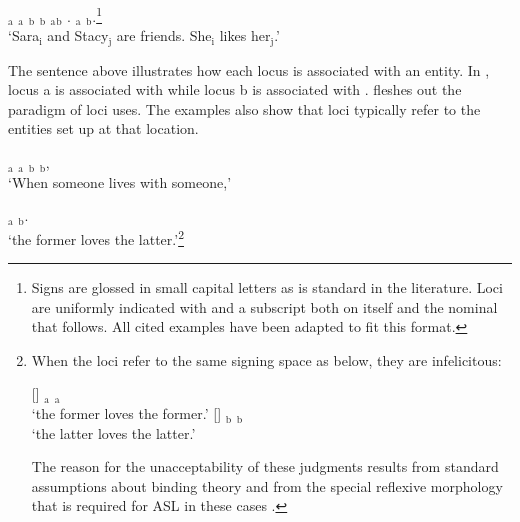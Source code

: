\documentclass[output=paper,
modfonts
]{langscibook}
\begin{document}
\begin{exe}
\ex \label{ex:irani:1} 
$_\text{a}$ $_\text{a}$ $_\text{b}$ $_\text{b}$ $_\text{a}$$_\text{b}$ . $_\text{a}$  $_\text{b}$.\footnote{Signs are glossed in small capital letters as is standard in the literature. Loci are uniformly indicated with  and a subscript both on  itself and the nominal that follows. All cited examples have been adapted to fit this format.}\\
`Sara$_\text{i}$ and Stacy$_\text{j}$ are friends. She$_\text{i}$ likes her$_\text{j}$.'
\end{exe}

The sentence above illustrates how each locus is associated with an entity. In , locus a is associated with  while locus b is associated with .  fleshes out the paradigm of loci uses. The examples also show that loci typically refer to the entities set up at that location.

\begin{exe}
\ex \label{ex:irani:2}
\begin{xlist}
	\ex  {} $_\text{a}$ $_\text{a}$   $_\text{b}$ $_\text{b}$, \\
	`When someone lives with someone,’ 
	
	\ex {}$_\text{a}$  $_\text{b}$. \\
	`the former loves the latter.’\footnote{ When the loci refer to the same signing space as below, they are infelicitous:
		
		\begin{exe} 
			\begin{xlist}
				[\fts{\#}]{\footnotesize
					$_\text{a}$  $_\text{a}$ \\
					`the former loves the former.' }
				[\fts{\#}]{\footnotesize 
					$_\text{b}$  $_\text{b}$\\
					`the latter loves the latter.'}
			\end{xlist}
		\end{exe}
		
		The reason for the unacceptability of these judgments results from standard assumptions about binding theory \citep{ReinhartReuland1993} and from the special reflexive morphology that is required for ASL in these cases \citep{Meir1998}.} \citep[adapted from][13]{Schlenker2010}
	
\end{xlist}
\end{exe}
\end{document}
